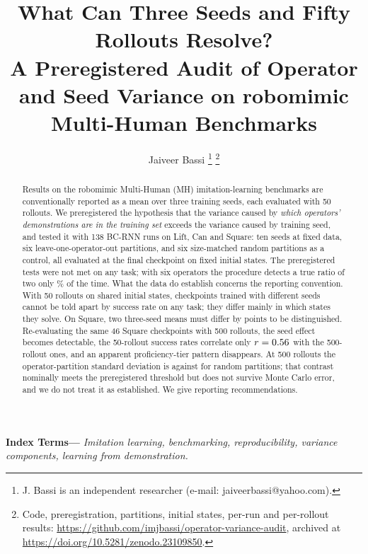 \IfFileExists{IEEEtran.cls}{\documentclass[journal]{IEEEtran}}{\documentclass[10pt,twocolumn]{article}}
\newenvironment{IEEEkeywords}{\par\smallskip\noindent\textbf{Index Terms---}\itshape}{\par}
\begin{document}
\title{What Can Three Seeds and Fifty Rollouts Resolve?\\ A Preregistered Audit of Operator and Seed Variance on robomimic Multi-Human Benchmarks}

\author{Jaiveer Bassi%
\thanks{J. Bassi is an independent researcher (e-mail: jaiveerbassi@yahoo.com).}%
\thanks{Code, preregistration, partitions, initial states, per-run and per-rollout results: \protect\url{https://github.com/imjbassi/operator-variance-audit}, archived at \protect\url{https://doi.org/10.5281/zenodo.23109850}.}}

\maketitle

\begin{abstract}
Results on the robomimic Multi-Human (MH) imitation-learning benchmarks are conventionally reported as a mean over three training seeds, each evaluated with 50 rollouts. We preregistered the hypothesis that the variance caused by \emph{which operators' demonstrations are in the training set} exceeds the variance caused by training seed, and tested it with 138 BC-RNN runs on Lift, Can and Square: ten seeds at fixed data, six leave-one-operator-out partitions, and six size-matched random partitions as a control, all evaluated at the final checkpoint on fixed initial states. The preregistered tests were not met on any task; with six operators the procedure detects a true ratio of two only \OneSqPowTwo\% of the time. What the data do establish concerns the reporting convention. With 50 rollouts on shared initial states, checkpoints trained with different seeds cannot be told apart by success rate on any task; they differ mainly in which states they solve. On Square, two three-seed means must differ by \OneSqMDD{} points to be distinguished. Re-evaluating the same 46 Square checkpoints with 500 rollouts, the seed effect becomes detectable, the 50-rollout success rates correlate only $r=0.56$ with the 500-rollout ones, and an apparent proficiency-tier pattern disappears. At 500 rollouts the operator-partition standard deviation is \TwoSqBSDp{} against \TwoSqCSDp{} for random partitions; that contrast nominally meets the preregistered threshold but does not survive Monte Carlo error, and we do not treat it as established. We give reporting recommendations.
\end{abstract}

\begin{IEEEkeywords}
Imitation learning, benchmarking, reproducibility, variance components, learning from demonstration.
\end{IEEEkeywords}
\end{document}
